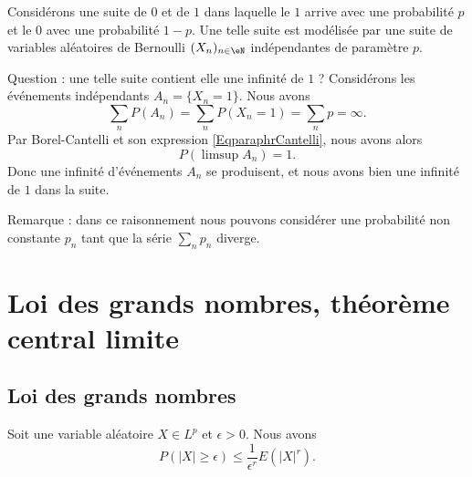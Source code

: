 \begin{example}
    Considérons une suite de \( 0\) et de \( 1\) dans laquelle le \( 1\) arrive avec une probabilité \( p\) et le \( 0\) avec une probabilité \( 1-p\). Une telle suite est modélisée par une suite de variables aléatoires de Bernoulli \( (X_n)_{n\in\eN}\) indépendantes de paramètre \( p\).

    Question : une telle suite contient elle une infinité de \( 1\) ? Considérons les événements indépendants \( A_n=\{ X_n=1 \}\). Nous avons
    \begin{equation}
        \sum_n P(A_n)=\sum_nP(X_n=1)=\sum_np=\infty.
    \end{equation}
    Par Borel-Cantelli et son expression \eqref{EqparaphrCantelli}, nous avons alors
    \begin{equation}
        P(\limsup A_n)=1.
    \end{equation}
    Donc une infinité d'événements \( A_n\) se produisent, et nous avons bien une infinité de \( 1\) dans la suite.

    Remarque : dans ce raisonnement nous pouvons considérer une probabilité non constante \( p_n\) tant que la série \( \sum_np_n\) diverge.
\end{example}

\section{Loi des grands nombres, théorème central limite}

\subsection{Loi des grands nombres}

\begin{lemma}
    Soit une variable aléatoire \( X\in L^p\) et \( \epsilon>0\). Nous avons
    \begin{equation}
        P(| X |\geq \epsilon)\leq \frac{1}{ \epsilon^r }E(| X |^r).
    \end{equation}
\end{lemma}

